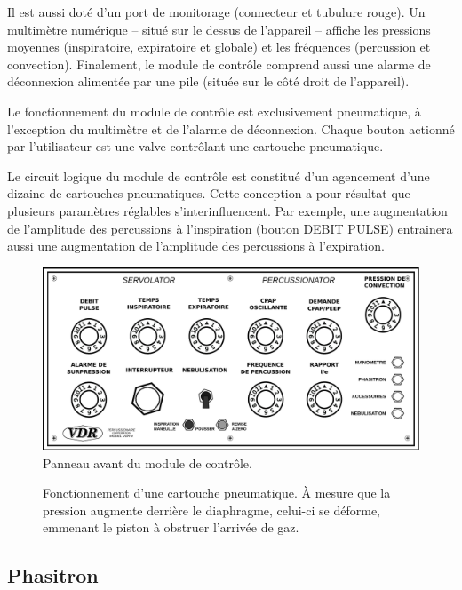 Il est aussi doté d'un port de monitorage (connecteur et tubulure
rouge).  Un multimètre numérique -- situé sur le dessus de l'appareil
-- affiche les pressions moyennes (inspiratoire, expiratoire et
globale) et les fréquences (percussion et convection).  Finalement, le
module de contrôle comprend aussi une alarme de déconnexion alimentée
par une pile (située sur le côté droit de l'appareil).

Le fonctionnement du module de contrôle est exclusivement pneumatique,
à l'exception du multimètre et de l'alarme de déconnexion.  Chaque
bouton actionné par l'utilisateur est une valve contrôlant une
cartouche pneumatique. 

Le circuit logique du module de contrôle est constitué d'un agencement
d'une dizaine de cartouches pneumatiques.  Cette conception a pour
résultat que plusieurs paramètres réglables s'interinfluencent.  Par
exemple, une augmentation de l'amplitude des percussions à
l'inspiration (bouton DEBIT PULSE) entrainera aussi une augmentation
de l'amplitude des percussions à l'expiration.

\begin{figure}
	\includegraphics[width=\textwidth]{img/Module_de_controle}
	\caption{Panneau avant du module de contrôle.}
\end{figure}

\begin{figure}
	
	\caption[Fonctionnement d'une cartouche pneumatique.]{Fonctionnement d'une cartouche pneumatique. À mesure que la pression
	augmente derrière le diaphragme, celui-ci se déforme, emmenant  le piston à
	obstruer l'arrivée de gaz.} 
\end{figure}

\subsection{Phasitron}

